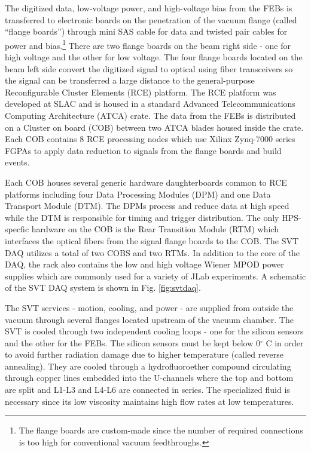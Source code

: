 The digitized data, low-voltage power, and high-voltage bias from the FEBs is transferred to electronic boards on the penetration of the vacuum flange (called ``flange boards'') through mini SAS cable for data and twisted pair cables for power and bias.\footnote{The flange boards are custom-made since the number of required connections is too high for conventional vacuum feedthroughs.} There are two flange boards on the beam right side - one for high voltage and the other for low voltage. The four flange boards located on the beam left side convert the digitized signal to optical using fiber transceivers so the signal can be transferred a large distance to the general-purpose Reconfigurable Cluster Elements (RCE) platform. The RCE platform was developed at SLAC and is housed in a standard Advanced Telecommunications Computing Architecture (ATCA) crate. The data from the FEBs is distributed on a Cluster on board (COB) between two ATCA blades housed inside the crate. Each COB contains 8 RCE processing nodes which use Xilinx Zynq-7000 series FGPAs to apply data reduction to signals from the flange boards and build events.

Each COB houses several generic hardware daughterboards common to RCE platforms including four Data Processing Modules (DPM) and one Data Transport Module (DTM). The DPMs process and reduce data at high speed while the DTM is responsible for timing and trigger distribution. The only HPS-specfic hardware on the COB is the Rear Transition Module (RTM) which interfaces the optical fibers from the signal flange boards to the COB. The SVT DAQ utilizes a total of two COBS and two RTMs. In addition to the core of the DAQ, the rack also contains the low and high voltage Wiener MPOD power supplies which are commonly used for a variety of JLab experiments. A schematic of the SVT DAQ system is shown in Fig. \ref{fig:svtdaq}.

The SVT services - motion, cooling, and power - are supplied from outside the vacuum through several flanges located upstream of the vacuum chamber. The SVT is cooled through two independent cooling loops - one for the silicon sensors and the other for the FEBs. The silicon sensors must be kept below 0$^{\circ}$ C in order to avoid further radiation damage due to higher temperature (called reverse annealing). They are cooled through a hydrofluoroether compound circulating through copper lines embedded into the U-channels where the top and bottom are split and L1-L3 and L4-L6 are connected in series. The specialized fluid is necessary since its low viscosity maintains high flow rates at low temperatures.

